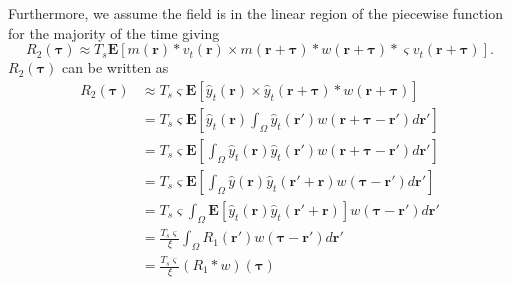 \documentclass[]{article}
\begin{document}
Furthermore, we assume the field is in the linear region of the piecewise function for the majority of the time giving
\begin{equation}
	R_2(\boldsymbol{\tau}) \approx T_s\mathbf{E}\left[ m\left(\mathbf{r}\right) \ast v_t\left(\mathbf{r}\right) \times m\left(\mathbf{r}+\boldsymbol{\tau}\right) \ast w\left(\mathbf{r}+\boldsymbol{\tau}\right) \ast \varsigma v_t\left(\mathbf{r}+\boldsymbol{\tau}\right) \right].
\end{equation}
$R_2(\boldsymbol{\tau})$ can be written as
\begin{align}
	R_2(\boldsymbol{\tau}) &\approx	T_s \varsigma \mathbf{E}\left[ \hat{y}_t\left(\mathbf{r}\right) \times \hat{y}_t\left(\mathbf{r}+\boldsymbol{\tau}\right) \ast w\left(\mathbf{r}+\boldsymbol{\tau}\right)\right] \\
	&= T_s \varsigma \mathbf{E}\left[ \hat{y}_t\left(\mathbf{r}\right)  \int_{\Omega}\hat{y}_t\left(\mathbf{r'}\right) w\left(\mathbf{r}+\boldsymbol{\tau}-\mathbf{r'}\right) d\mathbf{r'} \right] \\
	&= T_s \varsigma \mathbf{E}\left[  \int_{\Omega}\hat{y}_t\left(\mathbf{r}\right)\hat{y}_t\left(\mathbf{r'}\right) w\left(\mathbf{r}+\boldsymbol{\tau}-\mathbf{r'}\right) d\mathbf{r'} \right] \\
	&= T_s \varsigma \mathbf{E}\left[  \int_{\Omega}\hat{y}\left(\mathbf{r}\right)\hat{y}_t\left(\mathbf{r'}+\mathbf{r}\right) w\left(\boldsymbol{\tau}-\mathbf{r'}\right) d\mathbf{r'} \right] \\
	&= T_s \varsigma   \int_{\Omega}\mathbf{E}\left[\hat{y}_t\left(\mathbf{r}\right)\hat{y}_t\left(\mathbf{r'}+\mathbf{r}\right) \right] w\left(\boldsymbol{\tau}-\mathbf{r}'\right) d\mathbf{r'} \nonumber \\
	&= \frac{T_s \varsigma}{\xi} \int_{\Omega} R_1(\mathbf{r'}) w\left(\boldsymbol{\tau}-\mathbf{r}'\right) d\mathbf{r'} \nonumber \\
	&= \frac{T_s \varsigma}{\xi} \left(R_1 \ast w\right)\left(\boldsymbol{\tau}\right)\\
\end{align}
\end{document}
